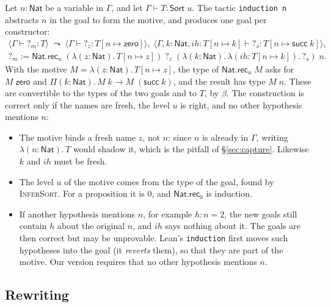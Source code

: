\documentclass[acmsmall,screen,nonacm]{acmart}
\newcommand{\Sort}[1]{\mathsf{Sort}\;#1}
\newcommand{\tPi}[3]{\Pi(#1{:}#2).\,#3}
\newcommand{\tLam}[3]{\lambda(#1{:}#2).\,#3}
\newcommand{\subst}[3]{#1[#2 \mapsto #3]}
\newcommand{\Nat}{\mathsf{Nat}}
\newcommand{\zero}{\mathsf{zero}}
\newcommand{\tsucc}{\mathsf{succ}}
\newcommand{\NatRec}[1]{\mathsf{Nat.rec}_{#1}}
\newcommand{\hole}[1]{?_{#1}}
\begin{document}
Let $n : \Nat$ be a variable in $\Gamma$, and let $\Gamma \vdash T : \Sort{u}$.
The tactic \texttt{induction n} abstracts $n$ in the goal to form the motive, and produces one goal per constructor:
\[
\begin{array}{l}
\langle \Gamma \vdash \hole{m} : T \rangle
\;\leadsto\;
\langle \Gamma \vdash \hole{z} : \subst{T}{n}{\zero} \rangle,\;
\langle \Gamma, k : \Nat, \mathit{ih} : \subst{T}{n}{k} \vdash \hole{s} : \subst{T}{n}{\tsucc\;k} \rangle, \\[4pt]
\hole{m} \mathrel{:=} \NatRec{u}\;(\tLam{z}{\Nat}{\subst{T}{n}{z}})\;\hole{z}\;(\tLam{k}{\Nat}{\tLam{\mathit{ih}}{\subst{T}{n}{k}}{\hole{s}}})\;n.
\end{array}
\]
With the motive $M = \tLam{z}{\Nat}{\subst{T}{n}{z}}$, the type of $\NatRec{u}\;M$ asks for $M\;\zero$ and $\tPi{k}{\Nat}{M\;k \to M\;(\tsucc\;k)}$, and the result has type $M\;n$.
These are convertible to the types of the two goals and to $T$, by $\beta$.
The construction is correct only if the names are fresh, the level $u$ is right, and no other hypothesis mentions $n$:
\begin{itemize}
  \item The motive binds a fresh name $z$, not $n$: since $n$ is already in $\Gamma$, writing $\tLam{n}{\Nat}{T}$ would shadow it, which is the pitfall of \S\ref{sec:capture}.
    Likewise $k$ and $\mathit{ih}$ must be fresh.
  \item The level $u$ of the motive comes from the type of the goal, found by \textsc{InferSort}. For a proposition it is $0$, and $\NatRec{0}$ is induction.
  \item If another hypothesis mentions $n$, for example $h : n = 2$, the new goals still contain $h$ about the original $n$, and $\mathit{ih}$ says nothing about it.
    The goals are then correct but may be unprovable.
    Lean's \texttt{induction} first moves such hypotheses into the goal (it \emph{reverts} them), so that they are part of the motive.
    Our version requires that no other hypothesis mentions $n$.
\end{itemize}

\subsection{Rewriting}
\end{document}

